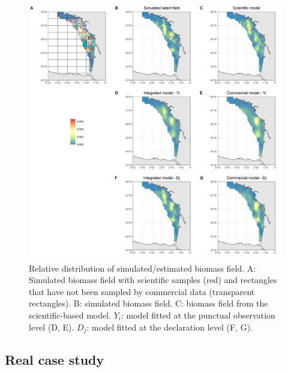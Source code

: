 \documentclass[
  english,
  man]{apa6}
\begin{document}
\begin{figure}
\centering
\includegraphics{images/Map_multi_square.png}
\caption{\label{fig:MapSeveral} Relative distribution of simulated/estimated biomass field. A: Simulated biomass field with scientific samples (red) and rectangles that have not been sampled by commercial data (transparent rectangles). B: simulated biomass field. C: biomass field from the scientific-based model. \(Y_i\): model fitted at the punctual observation level (D, E). \(D_j\): model fitted at the declaration level (F, G).}
\end{figure}

\hypertarget{real-case-study}{%
\subsection{Real case study}\label{real-case-study}}
\end{document}
